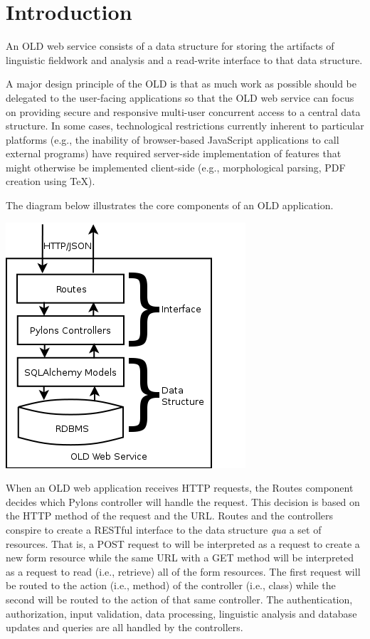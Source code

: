 \documentclass[letterpaper,10pt,english]{sphinxmanual}
\begin{document}
\section{Introduction}
\label{architecture:introduction}\label{architecture::doc}
An OLD web service consists of a data structure for storing the artifacts of
linguistic fieldwork and analysis and a read-write interface to that data
structure.

A major design principle of the OLD is that as much work as possible
should be delegated to the user-facing applications so that the OLD web service
can focus on providing secure and responsive multi-user concurrent access to
a central data structure.  In some cases, technological restrictions currently
inherent to particular platforms (e.g., the inability of browser-based JavaScript
applications to call external programs) have required server-side implementation
of features that might otherwise be implemented client-side (e.g., morphological
parsing, PDF creation using TeX).

The diagram below illustrates the core components of an OLD application.

{\hfill\includegraphics{OLD_diagram_med_level.png}\hfill}

When an OLD web application receives HTTP requests, the Routes component decides
which Pylons controller will handle the request.  This decision is based on the
HTTP method of the request and the URL.  Routes and the controllers conspire to
create a RESTful interface to the data structure \emph{qua} a set of resources.  That
is, a POST request to  will be interpreted as a request
to create a new form resource while the same URL with a GET method will be
interpreted as a request to read (i.e., retrieve) all of the form resources.
The first request will be routed to the  action (i.e., method) of the
 controller (i.e., class) while the second will be routed to the
 action of that same controller.  The authentication, authorization,
input validation, data processing, linguistic analysis and database updates and
queries are all handled by the controllers.
\end{document}

